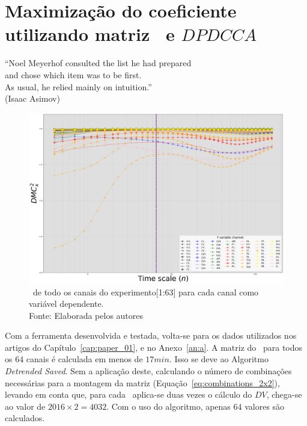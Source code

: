 \chapter{ Maximização do coeficiente \dmc utilizando matriz \pdcca~e $DPDCCA$}\label{cap:paper_03}



\begin{flushright}
    ``Noel Meyerhof consulted the list he had prepared \\
    and chose which item was to be first. \\
    As usual, he relied mainly on intuition.''\\[10px]
    (Isaac Asimov)
    \end{flushright}

\begin{figure}[!htb]
	\centering
	\includegraphics[width=.95\textwidth]{./Figures/art_03/dmc_all.png}
  \captionsetup{justification=centering}
  \caption{\dmc~de todo os canais do experimento[1:63] para cada canal como variável dependente.\\Fonte: Elaborada pelos autores}

	\label{fig:a03_dmc_total}
\end{figure}

Com a ferramenta desenvolvida e testada, volta-se para os dados utilizados nos artigos do Capítulo~\ref{cap:paper_01}, e no Anexo~\ref{an:a}. A matriz do \pdcca~para todos os $64$ canais é calculada em menos de $17min$. Isso se deve ao Algoritmo \emph{Detrended Saved}. Sem a aplicação deste, calculando o número de combinações necessárias para a montagem da matriz (Equação~\ref{eq:combinations_2x2}), levando em conta que, para cada \dcca~aplica-se duas vezes o cálculo do $DV$, chega-se ao valor de $2016 \times 2 = 4032$. Com o uso do algoritmo, apenas $64$ valores são calculados.

